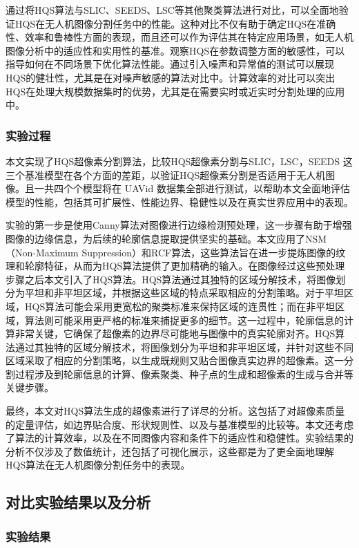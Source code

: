 通过将HQS算法与SLIC、SEEDS、LSC等其他聚类算法进行对比，可以全面地验证HQS在无人机图像分割任务中的性能。这种对比不仅有助于确定HQS在准确性、效率和鲁棒性方面的表现，而且还可以作为评估其在特定应用场景，如无人机图像分析中的适应性和实用性的基准。观察HQS在参数调整方面的敏感性，可以指导如何在不同场景下优化算法性能。通过引入噪声和异常值的测试可以展现HQS的健壮性，尤其是在对噪声敏感的算法对比中。计算效率的对比可以突出HQS在处理大规模数据集时的优势，尤其是在需要实时或近实时分割处理的应用中。

\subsubsection{实验过程}
本文实现了HQS超像素分割算法，比较HQS超像素分割与SLIC，LSC，SEEDS 这三个基准模型在各个方面的差距，以验证HQS超像素分割是否适用于无人机图像。且一共四个个模型将在 UAVid 数据集全部进行测试，以帮助本文全面地评估模型的性能，包括其可扩展性、性能边界、稳健性以及在真实世界应用中的表现。

实验的第一步是使用Canny算法对图像进行边缘检测预处理，这一步骤有助于增强图像的边缘信息，为后续的轮廓信息提取提供坚实的基础。本文应用了NSM（Non-Maximum Suppression）和RCF算法，这些算法旨在进一步提炼图像的纹理和轮廓特征，从而为HQS算法提供了更加精确的输入。在图像经过这些预处理步骤之后本文引入了HQS算法。HQS算法通过其独特的区域分解技术，将图像划分为平坦和非平坦区域，并根据这些区域的特点采取相应的分割策略。对于平坦区域，HQS算法可能会采用更宽松的聚类标准来保持区域的连贯性；而在非平坦区域，算法则可能采用更严格的标准来捕捉更多的细节。这一过程中，轮廓信息的计算非常关键，它确保了超像素的边界尽可能地与图像中的真实轮廓对齐。HQS算法通过其独特的区域分解技术，将图像划分为平坦和非平坦区域，并针对这些不同区域采取了相应的分割策略，以生成既规则又贴合图像真实边界的超像素。这一分割过程涉及到轮廓信息的计算、像素聚类、种子点的生成和超像素的生成与合并等关键步骤。

最终，本文对HQS算法生成的超像素进行了详尽的分析。这包括了对超像素质量的定量评估，如边界贴合度、形状规则性、以及与基准模型的比较等。本文还考虑了算法的计算效率，以及在不同图像内容和条件下的适应性和稳健性。实验结果的分析不仅涉及了数值统计，还包括了可视化展示，这些都是为了更全面地理解HQS算法在无人机图像分割任务中的表现。

\subsection{对比实验结果以及分析}

\subsubsection{实验结果}

